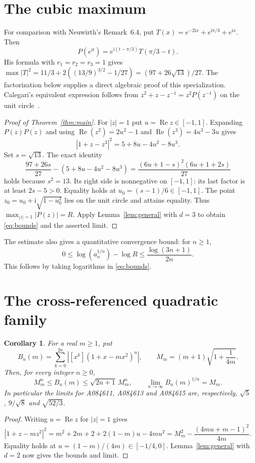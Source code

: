 \documentclass[11pt]{article}
\newtheorem{corollary}[theorem]{Corollary}
\begin{document}
\section{The cubic maximum}
For comparison with Neuwirth's Remark~6.4, put
$T(x)=e^{-2\mathrm ix}+e^{\mathrm i\pi/3}+e^{\mathrm ix}$.
Then
\[
 P(e^{\mathrm it})=e^{\mathrm i(t-\pi/3)}T(\pi/3-t).
\]
His formula with $r_1=r_2=r_3=1$ gives
$\max|T|^2=11/3+2((13/9)^{3/2}-1/27)=(97+26\sqrt{13})/27$.
The factorization below supplies a direct algebraic proof of this
specialization. Calegari's equivalent expression follows from
$z^2+z-z^{-1}=z^2P(z^{-1})$ on the unit circle~\cite{calegari}.
\begin{proof}[Proof of Theorem~\ref{thm:main}]
For $|z|=1$ put $u=\operatorname{Re}z\in[-1,1]$.
Expanding $P(z)\overline{P(z)}$ and using
$\operatorname{Re}(z^2)=2u^2-1$ and
$\operatorname{Re}(z^3)=4u^3-3u$ gives
\begin{equation}\label{eq:cubic}
 |1+z-z^3|^2=5+8u-4u^2-8u^3.
\end{equation}
Set $s=\sqrt{13}$. The exact identity
\begin{equation}\label{eq:gap}
 \frac{97+26s}{27}-(5+8u-4u^2-8u^3)
 =\frac{(6u+1-s)^2(6u+1+2s)}{27}
\end{equation}
holds because $s^2=13$.
Its right side is nonnegative on $[-1,1]$: its last factor
is at least $2s-5>0$. Equality holds at
$u_0=(s-1)/6\in[-1,1]$.
The point $z_0=u_0+\mathrm i\sqrt{1-u_0^2}$ lies on the unit circle
and attains equality. Thus $\max_{|z|=1}|P(z)|=R$.
Apply Lemma~\ref{lem:general} with $d=3$ to obtain
\eqref{eq:bounds} and the asserted limit.
\end{proof}

The estimate also gives a quantitative convergence bound:
for $n\geq1$,
\[
 0\leq\log(a_n^{1/n})-\log R\leq\frac{\log(3n+1)}{2n}.
\]
This follows by taking logarithms in \eqref{eq:bounds}.

\section{The cross-referenced quadratic family}
\begin{corollary}\label{cor:quadratic}
For a real $m\geq1$, put
\[
 B_n(m)=\sum_{k=0}^{2n}|[x^k](1+x-mx^2)^n|,\qquad
 M_m=(m+1)\sqrt{1+\frac1{4m}}.
\]
Then, for every integer $n\geq0$,
\[
 M_m^n\leq B_n(m)\leq\sqrt{2n+1}\,M_m^n,
 \qquad\lim_{n\to\infty}B_n(m)^{1/n}=M_m.
\]
In particular the limits for A084611, A084613 and A084615 are, respectively,
$\sqrt5$, $9/\sqrt8$ and $\sqrt{52/3}$.
\end{corollary}
\begin{proof}
Writing $u=\operatorname{Re}z$ for $|z|=1$ gives
\[
 |1+z-mz^2|^2=m^2+2m+2+2(1-m)u-4mu^2
 =M_m^2-\frac{(4mu+m-1)^2}{4m}.
\]
Equality holds at $u=(1-m)/(4m)\in[-1/4,0]$.
Lemma~\ref{lem:general} with $d=2$ now gives the bounds and limit.
\end{proof}
\end{document}
